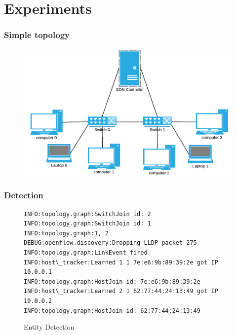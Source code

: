 
\section{Experiments}


%
%
\begin{frame}\frametitle{Simple topology}

	\begin{figure}[h]
        \centering
        \includegraphics[scale=0.3]{img/simple-topology.png}
    \end{figure}

\end{frame}



%
%
\begin{frame}[fragile]\frametitle{Detection}


\begin{figure}[h!]
\centering
\begin{lstlisting}[]
INFO:topology.graph:SwitchJoin id: 2
INFO:topology.graph:SwitchJoin id: 1
INFO:topology.graph:1, 2
DEBUG:openflow.discovery:Dropping LLDP packet 275
INFO:topology.graph:LinkEvent fired
INFO:host\_tracker:Learned 1 1 7e:e6:9b:89:39:2e got IP 10.0.0.1
INFO:topology.graph:HostJoin id: 7e:e6:9b:89:39:2e
INFO:host\_tracker:Learned 2 1 62:77:44:24:13:49 got IP 10.0.0.2
INFO:topology.graph:HostJoin id: 62:77:44:24:13:49
\end{lstlisting}
\caption{Entity Detection}
\label{fig:detection}
\end{figure}
\end{frame}



